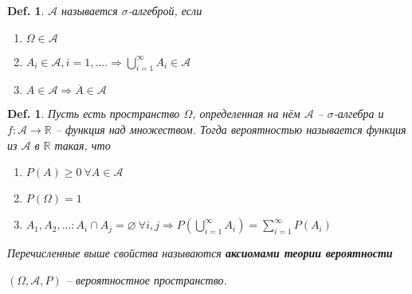 \documentclass[12pt]{article}
\newenvironment{MyList}[1][4pt]{
  \begin{enumerate}[1.]
  \setlength{\parskip}{0pt}
  \setlength{\itemsep}{#1}
}{       
  \end{enumerate}
}
\def\R{\mathbb{R}}       %
\def\SO{\Rightarrow}     %
\def\Pagebreak{\pagebreak\vspace*{-1.5em}}
\theoremstyle{definition} %
\theoremstyle{plain} %
\newtheorem{Def}[Thm]{Def.} %
\theoremstyle{remark} %
\begin{document}
\begin{Def}
    $\mathscr{A}$ называется $\sigma$-алгеброй, если 
    \begin{MyList}
        \item $\Omega \in \mathscr{A}$ 
        \item $A_i \in \mathscr{A}, i = 1, .... \SO \bigcup_{i = 1}^\infty A_i \in \mathscr{A}$
        \item $A \in \mathscr{A} \SO \overline{A} \in \mathscr{A}$
    \end{MyList} 
\end{Def}

\begin{Def}
    Пусть есть пространство $\Omega$, определенная на нём $\mathscr{A}$ -- $\sigma$-алгебра и $f: \mathscr{A} \to \R$ -- функция над множеством.
    Тогда вероятностью называется функция из $\mathscr{A}$ в $\R$ такая, что
    \begin{MyList}
        \item $P(A) \geqslant 0 \ \forall A \in \mathscr{A}$ 
        \item $P(\Omega) = 1$
        \item $A_1, A_2, ... : A_i \cap A_j = \varnothing \ \forall i, j \SO P(\bigcup_{i = 1}^\infty A_i) = \sum_{i=1}^{\infty} P(A_i)$  
    \end{MyList}
    Перечисленные выше свойства называются \textbf{аксиомами теории вероятности}
    
    $(\Omega, \mathscr{A}, P)$ -- вероятностное пространство.
\end{Def}
\Pagebreak
\end{document}
